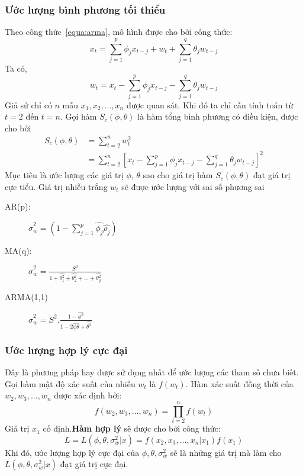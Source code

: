 \subsubsection{Ước lượng bình phương tối thiểu}
Theo công thức~\ref{equa:arma}, mô hình được cho bởi công thức:
\begin{equation}
x_t = \sum\limits_{j=1}^{p}\phi_jx_{t-j}+w_t+\sum\limits_{j=1}^{q}\theta_jw_{t-j}
\end{equation}
Ta có,\begin{equation}\label{cls_wt}
	w_t = x_t - \sum\limits_{j=1}^{p}\phi_jx_{t-j}- \sum\limits_{j=1}^{q}\theta_jw_{t-j}
\end{equation}
Giả sử chỉ có $n$ mẫu $x_1,x_2,...,x_n$ được quan sát. Khi đó ta chỉ cần tính toán từ $t=2$ đến $t=n$. Gọi hàm $S_c(\phi,\theta)$ là hàm tổng bình phương có điều kiện, được cho bởi
\begin{align}
	S_c(\phi,\theta) &= \sum\limits_{t=2}^{n}w_t^{2} \\
					&=	\sum\limits_{t=2}^{n}[x_t - \sum\limits_{j=1}^{p}\phi_jx_{t-j}- \sum\limits_{j=1}^{q}\theta_jw_{t-j}]^{2}
					\end{align}
Mục tiêu là ước lượng các giá trị $\phi$, $\theta$ sao cho giá trị hàm $S_c(\phi,\theta)$ đạt giá trị cực tiểu.
Giá trị nhiễu trắng $w_t$ sẽ được ước lượng với sai số phương sai
\begin{description}
\item[AR(p):]\qquad\qquad $\hat{\sigma}_w^{2} = (1-\sum\limits^{p}_{j=1}\hat{\phi_j}\hat{\rho_j})$

\item [MA(q):]\qquad\qquad $\hat{\sigma}_w^{2} =\frac{S^2}{1+\hat{\theta_1^2}+\hat{\theta_2^2}+\dots+\hat{\theta_q^2}}$
\item[ARMA(1,1)]\qquad $\hat{\sigma}_w^{2} = S^2.\frac{1-\hat{\phi^2}}{1-2\hat{\phi}\hat{\theta}+\hat{\theta^2}}$
\end{description}
\subsubsection{Ước lượng hợp lý cực đại}
Đây là phương pháp hay được sử dụng nhất để ước lượng các tham số chưa biết.
Gọi hàm mật độ xác suất của nhiễu $w_t$ là $f(w_t)$. Hàm xác suất đồng thời của $w_2,w_3,...,w_n$ được xác định bởi:
\begin{equation}
	f(w_2,w_3,...,w_n) = \prod^{n}_{t=2} f(w_t)
\end{equation}
Giá trị $x_1$ cố định.\textbf{Hàm hợp lý} sẽ được cho bởi công thức:
\begin{equation}
	L= L(\phi,\theta,\sigma^{2}_{w}|x) = f(x_2,x_3,...,x_n|x_1) f(x_1)
\end{equation}
Khi đó, ước lượng hợp lý cực đại của $\phi,\theta,\sigma^{2}_{w}$ sẽ là những giá trị mà làm cho $L(\phi,\theta,\sigma^{2}_{w}|x)$ đạt giá trị cực đại.


